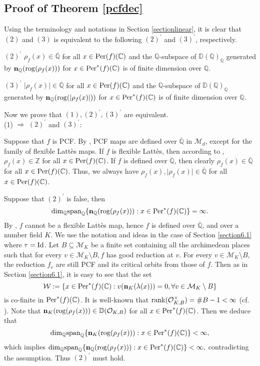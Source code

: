 \documentclass[12pt]{amsart}
\theoremstyle{plain}
\theoremstyle{remark}
\theoremstyle{definition}
\def\Z{\mathbb Z}
\def\Q{\mathbb Q}
\def\C{\mathbb C}
\def\D{\mathbb D}
\def\rog{{\rm rog}}
\begin{document}
\subsection{Proof of Theorem \ref{pcfdec}}Using the terminology and notations in Section \ref{sectionlinear}, it is clear that $(2)$ and $(3)$ is equivalent to the following $(2)^\prime$ and $(3)^\prime$, respectively.\par
$(2)^\prime$ $\rho_f(x)\in\overline{\Q}$ for all $x\in{\rm Per}(f)(\C)$ and the $\Q$-subspace of $\D(\Q)_\Q$ generated by $\mathbf{n}_{\Q}(\rog(\rho_f(x)))$ for $x\in{\rm Per}^*(f)(\C)$ is of finite dimension over $\Q$.\par
$(3)^\prime$ $\lvert\rho_f(x)\rvert\in\overline{\Q}$ for all $x\in{\rm Per}(f)(\C)$ and the $\Q$-subspace of $\D(\Q)_\Q$ generated by $\mathbf{n}_{\Q}(\rog(\lvert\rho_f(x)\lvert))$ for $x\in{\rm Per}^*(f)(\C)$ is of finite dimension over $\Q$.\par
Now we prove that $(1),(2)^\prime,(3)^\prime$ are equivalent.\\
(1) $\Rightarrow$ $(2)^\prime$ and $(3)^\prime$:\par
Suppose that $f$ is PCF. By \cite{Douady1993}, PCF maps are defined over $\overline{\Q}$ in $\mathcal{M}_d$, except for the family of flexible Latt\`es maps. If $f$ is flexible Latt\`es, then according to \cite[Lemma 5.6]{milnor2006lattes}, $\rho_{f}(x)\in\Z$ for all $x\in{\rm Per}(f)(\C)$. If $f$ is defined over $\overline{\Q}$, then clearly $\rho_{f}(x)\in\overline{\Q}$ for all $x\in{\rm Per}(f)(\C)$. Thus, we always have $\rho_f(x),\lvert\rho_f(x)\rvert\in\overline{\Q}$ for all $x\in{\rm Per}(f)(\C)$.\par 
Suppose that $(2)^\prime$ is false, then $${\rm dim}_{\Q}{\rm span}_\Q\{\mathbf{n}_{\Q}(\rog(\rho_f(x))):x\in{\rm Per}^*(f)(\C)\}=\infty.$$ By \cite[Corollary 3.9]{milnor2006lattes}, $f$ cannot be a flexible Latt\`es map, hence $f$ is defined over $\overline{\Q}$, and over a number field $K$. We use the notation and ideas in the case of Section \ref{section6.1} where $\tau={\rm Id}$. Let $B \subseteq \mathcal{M}_K$ be a finite set containing all the archimedean places such that for every $v \in \mathcal{M}_K \setminus B, f$ has good reduction at $v$. For every $v \in \mathcal{M}_K \setminus B$, the reduction $f_v$ are still PCF and its critical orbits from those of $f$. Then as in Section \ref{section6.1}, it is easy to see that the set $$\mathcal{W}:=\{x\in{\rm Per}^*(f)(\C):v(\mathbf{n}_K(\lambda(x)))=0,\forall v\in\mathcal{M}_K\setminus B\}$$ is co-finite in ${\rm Per}^*(f)(\C)$. It is well-known that ${\rm rank}(\mathcal{O}_{K,B}^\times)=\#B-1<\infty$ (cf. \cite[Theorem 3.12]{Narkiewicz2004}). Note that $\mathbf{n}_K(\rog(\rho_f(x)))\in\D(\mathcal{O}_{K,B})$ for all $x\in{\rm Per}^*(f)(\C)$. Then we deduce that $${\rm dim}_{\Q}{\rm span}_\Q\{\mathbf{n}_{K}(\rog(\rho_f(x))):x\in{\rm Per}^*(f)(\C)\}<\infty,$$ which implies ${\rm dim}_{\Q}{\rm span}_\Q\{\mathbf{n}_{\Q}(\rog(\rho_f(x))):x\in{\rm Per}^*(f)(\C)\}<\infty,$ contradicting the assumption. Thus $(2)^\prime$ must hold.\par 
\end{document}

